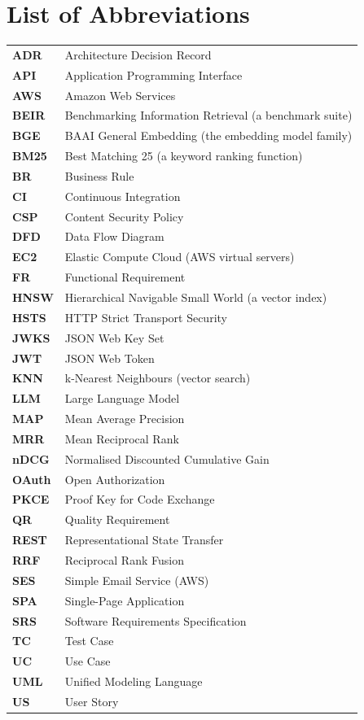 
\chapter*{List of Abbreviations}

{\small
\begin{longtable}{>{\bfseries}p{} p{}}
ADR & Architecture Decision Record \\
API & Application Programming Interface \\
AWS & Amazon Web Services \\
BEIR & Benchmarking Information Retrieval (a benchmark suite) \\
BGE & BAAI General Embedding (the embedding model family) \\
BM25 & Best Matching 25 (a keyword ranking function) \\
BR & Business Rule \\
CI & Continuous Integration \\
CSP & Content Security Policy \\
DFD & Data Flow Diagram \\
EC2 & Elastic Compute Cloud (AWS virtual servers) \\
FR & Functional Requirement \\
HNSW & Hierarchical Navigable Small World (a vector index) \\
HSTS & HTTP Strict Transport Security \\
JWKS & JSON Web Key Set \\
JWT & JSON Web Token \\
KNN & k-Nearest Neighbours (vector search) \\
LLM & Large Language Model \\
MAP & Mean Average Precision \\
MRR & Mean Reciprocal Rank \\
nDCG & Normalised Discounted Cumulative Gain \\
OAuth & Open Authorization \\
PKCE & Proof Key for Code Exchange \\
QR & Quality Requirement \\
REST & Representational State Transfer \\
RRF & Reciprocal Rank Fusion \\
SES & Simple Email Service (AWS) \\
SPA & Single-Page Application \\
SRS & Software Requirements Specification \\
TC & Test Case \\
UC & Use Case \\
UML & Unified Modeling Language \\
US & User Story \\
\end{longtable}
}
